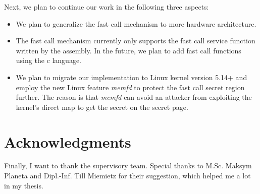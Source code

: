 Next, we plan to continue our work in the following three aspects:

\begin{itemize}
    \item We plan to generalize the fast call mechanism to more hardware architecture. 
    \item The fast call mechanism currently only supports the fast call service function written by the assembly. In the future, we plan to add fast call functions using the c language.
    \item We plan to migrate our implementation to Linux kernel version 5.14+ and employ the new Linux feature 
    \emph{memfd}\cite{27} to protect the fast call secret region further. The reason is that \emph{memfd} can avoid an attacker from exploiting the kernel's direct map to get the secret on the secret page.
\end{itemize}



\section{Acknowledgments}
Finally, I want to thank the supervisory team. Special 
thanks to M.Sc. Maksym Planeta and Dipl.-Inf. Till Miemietz for their suggestion, 
which helped me a lot in my thesis.





\cleardoublepage

